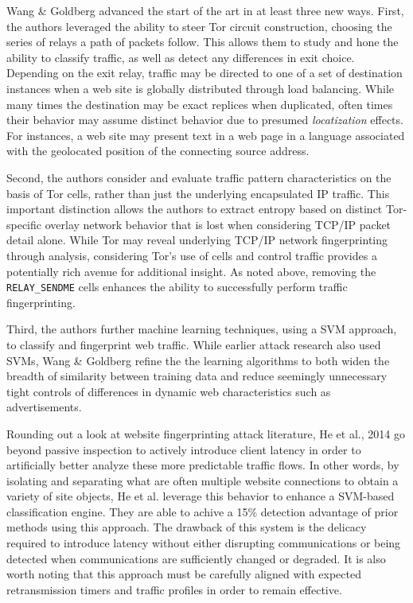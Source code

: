 \documentclass[sigconf]{acmart}
\begin{document}
Wang \& Goldberg advanced the start of the art in at least three new ways.
First, the authors leveraged the ability to steer Tor circuit
construction, choosing the series of relays a path of packets follow.
This allows them to study and hone the ability to classify traffic, as
well as detect any differences in exit choice.  Depending on the exit
relay, traffic may be directed to one of a set of destination instances
when a web site is globally distributed through load balancing.  While
many times the destination may be exact replices when duplicated, often
times their behavior may assume distinct behavior due to presumed
\emph{locatization} effects.  For instances, a web site may present text
in a web page in a language associated with the geolocated position of
the connecting source address.

Second, the authors consider and evaluate traffic pattern
characteristics on the basis of Tor cells, rather than just the
underlying encapsulated IP traffic.  This important distinction allows
the authors to extract entropy based on distinct Tor-specific overlay
network behavior that is lost when considering TCP/IP packet detail
alone.  While Tor may reveal underlying TCP/IP network fingerprinting
through analysis, considering Tor's use of cells and control traffic
provides a potentially rich avenue for additional insight.  As noted
above, removing the \texttt{RELAY\_SENDME} cells enhances the ability to
successfully perform traffic fingerprinting.

Third, the authors further machine learning techniques, using a SVM
approach, to classify and fingerprint web traffic.  While earlier attack
research also used SVMs, Wang \& Goldberg refine the the learning
algorithms to both widen the breadth of similarity between training data
and reduce seemingly unnecessary tight controls of differences in
dynamic web characteristics such as advertisements.

Rounding out a look at website fingerprinting attack literature, He et
al., 2014 \cite{he_novel_2014} go beyond passive inspection to actively
introduce client latency in order to artificially better analyze these
more predictable traffic flows.  In other words, by isolating and
separating what are often multiple website connections to obtain a
variety of site objects, He et al. leverage this behavior to enhance a
SVM-based classification engine.  They are able to achive a 15\%
detection advantage of prior methods using this approach.  The drawback
of this system is the delicacy required to introduce latency without
either disrupting communications or being detected when communications
are sufficiently changed or degraded.  It is also worth noting that this
approach must be carefully aligned with expected retransmission timers
and traffic profiles in order to remain effective.
\end{document}
